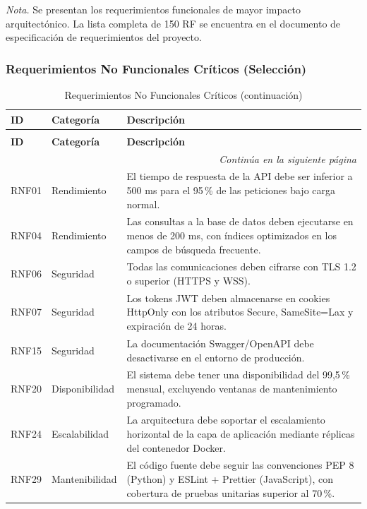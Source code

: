 \textit{Nota.} Se presentan los requerimientos funcionales de mayor impacto arquitectónico. La lista completa de 150 RF se encuentra en el documento de especificación de requerimientos del proyecto.

\subsubsection{Requerimientos No Funcionales Críticos (Selección)}

\begin{longtable}{p{1.2cm} p{2.5cm} p{10cm}}
\caption{Requerimientos No Funcionales Críticos} \\
\toprule
\textbf{ID} & \textbf{Categoría} & \textbf{Descripción} \\
\midrule
\endfirsthead

\caption[]{Requerimientos No Funcionales Críticos (continuación)} \\
\toprule
\textbf{ID} & \textbf{Categoría} & \textbf{Descripción} \\
\midrule
\endhead

\midrule
\multicolumn{3}{r}{\footnotesize\textit{Continúa en la siguiente página}} \\
\endfoot

\bottomrule
\endlastfoot

RNF01 & Rendimiento & El tiempo de respuesta de la API debe ser inferior a 500 ms para el 95\,\% de las peticiones bajo carga normal. \\
RNF04 & Rendimiento & Las consultas a la base de datos deben ejecutarse en menos de 200 ms, con índices optimizados en los campos de búsqueda frecuente. \\
RNF06 & Seguridad & Todas las comunicaciones deben cifrarse con TLS 1.2 o superior (HTTPS y WSS). \\
RNF07 & Seguridad & Los tokens JWT deben almacenarse en cookies HttpOnly con los atributos Secure, SameSite=Lax y expiración de 24 horas. \\
RNF15 & Seguridad & La documentación Swagger/OpenAPI debe desactivarse en el entorno de producción. \\
RNF20 & Disponibilidad & El sistema debe tener una disponibilidad del 99,5\,\% mensual, excluyendo ventanas de mantenimiento programado. \\
RNF24 & Escalabilidad & La arquitectura debe soportar el escalamiento horizontal de la capa de aplicación mediante réplicas del contenedor Docker. \\
RNF29 & Mantenibilidad & El código fuente debe seguir las convenciones PEP 8 (Python) y ESLint + Prettier (JavaScript), con cobertura de pruebas unitarias superior al 70\,\%. \\
\end{longtable}

